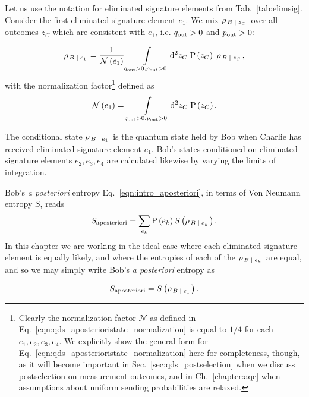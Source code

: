 Let us use the notation for eliminated signature elements from Tab.~\ref{tab:elimsig}. Consider the first eliminated signature element $e_1$. We mix $\rho_{\left. B \; \middle| \; z_C \right.}$ over all outcomes $z_C$ which are consistent with $e_1$, i.e. $q_{\text{out}} > 0$ and $p_{\text{out}} > 0$:

\begin{equation}\label{eqn:qds_aposterioristate}
\rho_{\left. B \; \middle| \; e_1\right.} = \frac{1}{\mathcal{N}\left(e_1\right)} \int\limits_{q_{\text{out}}>0, p_{\text{out}}>0} \mathop{}\!\mathrm{d^2} z_C \; \text{P}\left(z_C\right) \; \rho_{\left. B \; \middle| \;  z_C\right.},
\end{equation}
with the normalization factor\footnote{Clearly the normalization factor $\mathcal{N}$ as defined in Eq.~\ref{eqn:qds_aposterioristate_normalization} is equal to $1/4$ for each $e_1, e_2, e_3, e_4$. We explicitly show the general form for Eq.~\ref{eqn:qds_aposterioristate_normalization} here for completeness, though, as it will become important in Sec.~\ref{sec:qds_postselection} when we discuss postselection on measurement outcomes, and in Ch.~\ref{chapter:aqc} when assumptions about uniform sending probabilities are relaxed.} defined as
\begin{equation}\label{eqn:qds_aposterioristate_normalization}
\mathcal{N}\left(e_1\right) = \int\limits_{q_{\text{out}}>0, p_{\text{out}}>0} \mathop{}\!\mathrm{d^2} z_C \; \text{P}\left(z_C\right).
\end{equation}

\noindent The conditional state $\rho_{\left. B\; \middle| \; e_1\right.}$ is the quantum state held by Bob when Charlie has received eliminated signature element $e_1$. Bob's states conditioned on eliminated signature elements $e_2, e_3, e_4$ are calculated likewise by varying the limits of integration.

Bob's \emph{a posteriori} entropy Eq.~\ref{eqn:intro_aposteriori}, in terms of Von Neumann entropy $S$, reads
\begin{equation}
S_{\text{aposteriori}} = \sum_{e_k} \text{P}\left(e_k\right) S\left(\rho_{\left. B \; \middle| \; e_k\right.}\right).
\end{equation}
In this chapter we are working in the ideal case where each eliminated signature element is equally likely, and where the entropies of each of the $\rho_{\left. B \; \middle| \; e_k\right.}$ are equal, and so we may simply write Bob's \emph{a posteriori} entropy as

\begin{equation}\label{eqn:aposteriori_entropy}
S_{\text{aposteriori}} = S\left(\rho_{\left. B \; \middle| \; e_1\right.}\right).
\end{equation}

